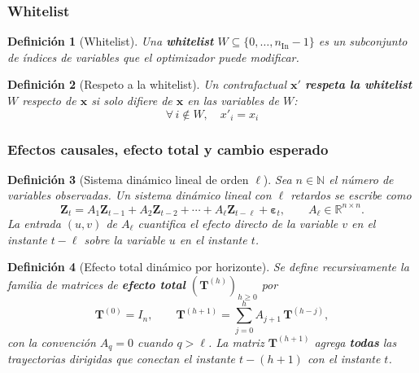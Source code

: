 \documentclass[12pt]{report} %
\newtheorem{definition}{Definición}
\begin{document}
\subsubsection{Whitelist}

\begin{definition}[Whitelist]
    Una \textbf{whitelist} $W \subseteq \{0, \ldots, n_{\text{In}}-1\}$ es un subconjunto de índices de variables que el optimizador puede modificar.
\end{definition}

\begin{definition}[Respeto a la whitelist]
    Un contrafactual $\mathbf{x}'$ \textbf{respeta la whitelist} $W$ respecto de $\mathbf{x}$ si solo difiere de $\mathbf{x}$ en las variables de $W$:
    $$\forall\, i \notin W,\quad x'_i = x_i$$
\end{definition}

\subsubsection{Efectos causales, efecto total y cambio esperado}

\begin{definition}[Sistema dinámico lineal de orden $\ell$]
    Sea $n \in \mathbb{N}$ el número de variables observadas. Un sistema dinámico lineal con $\ell$ retardos se escribe como
    \begin{equation}
        \mathbf{Z}_t = A_1 \mathbf{Z}_{t-1} + A_2 \mathbf{Z}_{t-2} + \cdots + A_\ell \mathbf{Z}_{t-\ell} + \boldsymbol{\varepsilon}_t,
        \qquad A_{\ell} \in \mathbb{R}^{n \times n}.
        \label{eq:formal_varp}
    \end{equation}
    La entrada $(u,v)$ de $A_{\ell}$ cuantifica el efecto \emph{directo} de la variable $v$ en el instante $t-\ell$ sobre la variable $u$ en el instante $t$.
\end{definition}

\begin{definition}[Efecto total dinámico por horizonte]
    Se define recursivamente la familia de matrices de \textbf{efecto total} $(\mathbf{T}^{(h)})_{h \geq 0}$ por
    \begin{equation}
        \mathbf{T}^{(0)} = I_n,
        \qquad
        \mathbf{T}^{(h+1)} = \sum_{j=0}^{h} A_{j+1}\,\mathbf{T}^{(h-j)},
        \label{eq:formal_total_lag_effect}
    \end{equation}
    con la convención $A_q = 0$ cuando $q > \ell$. La matriz $\mathbf{T}^{(h+1)}$ agrega \textbf{todas} las trayectorias dirigidas que conectan el instante $t-(h+1)$ con el instante $t$.
\end{definition}
\end{document}
